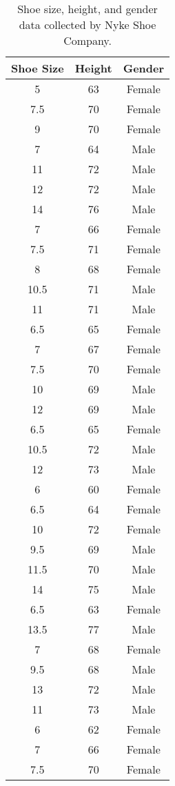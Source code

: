 

\begin{center}
\begin{longtable}{|c|c|c|}%
\caption{\label{tab:MainData}Shoe size, height, and gender data collected by Nyke Shoe Company.}\\
\hline
Shoe Size & Height & Gender \\ \hline
5 & 63 & Female \\
7.5 & 70 & Female \\
9 & 70 & Female \\
7 & 64 & Male \\
11 & 72 & Male \\
12 & 72 & Male \\
14 & 76 & Male \\
7 & 66 & Female \\
7.5 & 71 & Female \\
8 & 68 & Female \\
10.5 & 71 & Male \\
11 & 71 & Male \\
6.5 & 65 & Female \\
7 & 67 & Female \\
7.5 & 70 & Female \\
10 & 69 & Male \\
12 & 69 & Male \\
6.5 & 65 & Female \\
10.5 & 72 & Male \\
12 & 73 & Male \\
6 & 60 & Female \\
6.5 & 64 & Female \\
10 & 72 & Female \\
9.5 & 69 & Male \\
11.5 & 70 & Male \\
14 & 75 & Male \\
6.5 & 63 & Female \\
13.5 & 77 & Male \\
7 & 68 & Female \\
9.5 & 68 & Male \\
13 & 72 & Male \\
11 & 73 & Male \\
6 & 62 & Female \\
7 & 66 & Female \\
7.5 & 70 & Female \\
\hline
\end{longtable}
\end{center}

